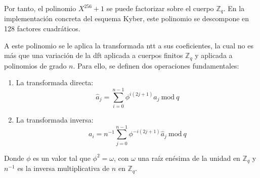 Por tanto, el polinomio \(X^{256} + 1\) se puede factorizar sobre el cuerpo \(\mathbb{Z}_q\). En la implementación concreta del esquema Kyber, este polinomio se descompone en 128 factores cuadráticos.
\newline

A este polinomio se le aplica la transformada \gls{ntt} a sus coeficientes, la cual no es más que una variación de la \gls{dft} aplicada a cuerpos finitos \(\mathbb{Z}_q\) y aplicada a polinomios de grado \(n\). Para ello, se definen dos operaciones fundamentales:
\begin{enumerate}
	\item La transformada directa:
	\begin{equation}
		\hat{a}_j=\sum_{i=0}^{n-1} \phi^{i\left(2j+1\right)} a_j \ \text{mod} \ q
	\end{equation}
	\item  La transformada inversa:
	\begin{equation}
		a_i=n^{-1} \sum_{j=0}^{n-1} \phi^{-i\left(2j+1\right)} \hat{a}_j \ \text{mod} \ q
	\end{equation}
\end{enumerate}

Donde $\phi$ es un valor tal que $\phi^2=\omega$, con $\omega$ una raíz enésima de la unidad en \(\mathbb{Z}_q\) y \(n^{-1}\) es la inversa multiplicativa de \(n\) en \(\mathbb{Z}_q\).
\newline

